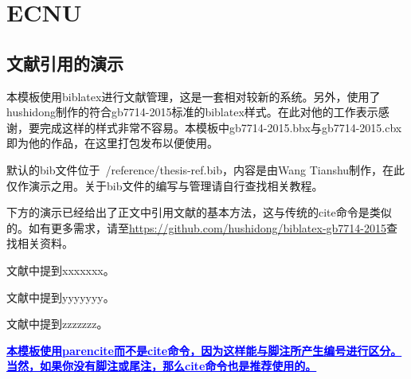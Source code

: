 \documentclass[twoside]{article}
\begin{document}
    \section*{ECNU}
\subsection{文献引用的演示}
\par 本模板使用biblatex进行文献管理，这是一套相对较新的系统。另外，使用了hushidong制作的符合gb7714-2015标准的biblatex样式。在此对他的工作表示感谢，要完成这样的样式非常不容易。本模板中gb7714-2015.bbx与gb7714-2015.cbx即为他的作品，在这里打包发布以便使用。
\par 默认的bib文件位于~/reference/thesis-ref.bib，内容是由Wang Tianshu制作，在此仅作演示之用。关于bib文件的编写与管理请自行查找相关教程。
\par 下方的演示已经给出了正文中引用文献的基本方法，这与传统的cite命令是类似的。如有更多需求，请至\url{https://github.com/hushidong/biblatex-gb7714-2015}查找相关资料。
\par 文献\parencite{Yang_Hy200215}中提到xxxxxxx。
\par 文献\parencite{Joa1999}中提到yyyyyyy。
\par 文献\parencite{Altman1997}中提到zzzzzzz。
\par \textcolor{blue}{\textbf{\uline{本模板使用parencite而不是cite命令，因为这样能与脚注所产生编号进行区分。当然，如果你没有脚注或尾注，那么cite命令也是推荐使用的。}}}

\printbibliography

    
\end{document}
